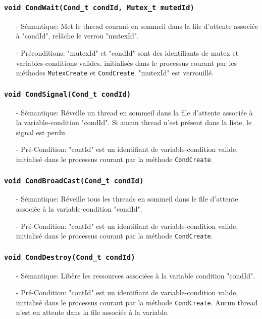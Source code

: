 \documentclass[11pt]{article}
\theoremstyle{definition}
\begin{document}
\subsubsection{\texttt{void CondWait(Cond\_t condId, Mutex\_t mutedId)}}
\begin{itemize}
\item[-]Sémantique: Met le thread courant en sommeil dans la file d'attente associée à "condId",
  relâche le verrou "mutexId".
\item[-]Préconditions: "mutexId" et "condId" sont des identifiants de mutex et variables-conditions
  valides, initialisés dans le processus courant par les méthodes \texttt{MutexCreate} et \texttt{CondCreate}.
  "mutexId" est verrouillé.
\end{itemize}

\subsubsection{\texttt{void CondSignal(Cond\_t condId)}}
\begin{itemize}
\item[-]Sémantique: Réveille un thread en sommeil dans la file d'attente associée à la variable-condition
  "condId". Si aucun thread n'est présent dans la liste, le signal est perdu.
\item[-]Pré-Condition: "contId" est un identifiant de variable-condition valide, initialisé dans le processus
  courant par la méthode \texttt{CondCreate}.
\end{itemize}

\subsubsection{\texttt{void CondBroadCast(Cond\_t condId)}}
\begin{itemize}
\item[-]Sémantique: Réveille tous les threads en sommeil dans le file d'attente associée à la
  variable-condition "condId".
\item[-]Pré-Condition: "contId" est un identifiant de variable-condition valide, initialisé dans le processus
  courant par la méthode \texttt{CondCreate}.
\end{itemize}

\subsubsection{\texttt{void CondDestroy(Cond\_t condId)}}
\begin{itemize}
\item[-]Sémantique: Libère les ressources associées à la variable condition "condId". 
\item[-]Pré-Condition: "contId" est un identifiant de variable-condition valide, initialisé dans le processus
  courant par la méthode \texttt{CondCreate}. Aucun thread n'est en attente dans la file associée à la variable.
\end{itemize}
\end{document}
